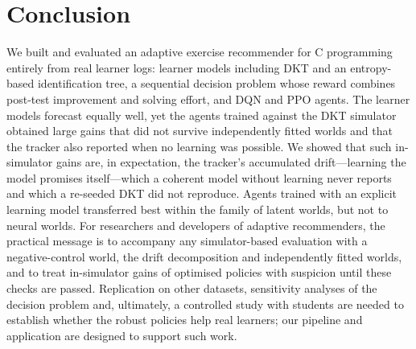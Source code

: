 \section{Conclusion}\label{sec:conclusion}

We built and evaluated an adaptive exercise recommender for C programming entirely from real learner logs: learner models including DKT and an entropy-based identification tree, a sequential decision problem whose reward combines post-test improvement and solving effort, and DQN and PPO agents. The learner models forecast equally well, yet the agents trained against the DKT simulator obtained large gains that did not survive independently fitted worlds and that the tracker also reported when no learning was possible. We showed that such in-simulator gains are, in expectation, the tracker's accumulated drift---learning the model promises itself---which a coherent model without learning never reports and which a re-seeded DKT did not reproduce. Agents trained with an explicit learning model transferred best within the family of latent worlds, but not to neural worlds. For researchers and developers of adaptive recommenders, the practical message is to accompany any simulator-based evaluation with a negative-control world, the drift decomposition and independently fitted worlds, and to treat in-simulator gains of optimised policies with suspicion until these checks are passed. Replication on other datasets, sensitivity analyses of the decision problem and, ultimately, a controlled study with students are needed to establish whether the robust policies help real learners; our pipeline and application are designed to support such work.
